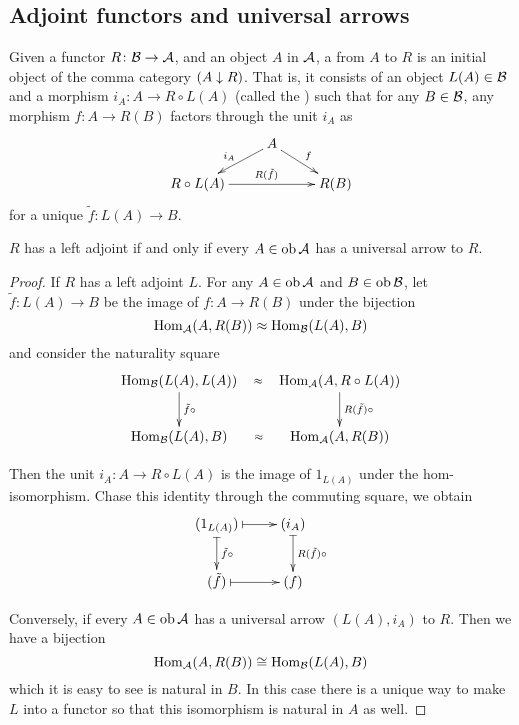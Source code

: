 \subsection{Adjoint functors and universal arrows}
  \begin{defn}
    Given a functor $R\colon{\cal B}\to{\cal A}$, and an object $A$ in ${\cal A}$, a  from $A$ to $R$ is an initial object of the comma category $(A\downarrow R)$. That is, it consists of an object $L(A)\in{\cal B}$ and a morphism $i_A : A\to R\circ L(A)$ (called the ) such that for any $B\in{\cal B}$, any morphism $f \colon A\to R(B)$ factors through the unit $i_A$ as
    \begin{displaymath}
      \xymatrix@R=0.5cm{
        &A\ar[dl]_{i_A}\ar[dr]^{f}&\\
        R\circ L(A)\ar[rr]^{R(\tilde{f})}&&R(B)
        }
    \end{displaymath}
    for a unique $\tilde{f}\colon L(A)\to B$.%
  \end{defn}
  \begin{prop}
    $R$ has a left adjoint if and only if every $A\in\operatorname{ob}{\cal A}$ has a universal arrow to $R$.
  \end{prop}
  \begin{proof}
    If $R$ has a left adjoint $L$. For any $A\in\operatorname{ob}{\cal A}$ and $B\in\operatorname{ob}{\cal B}$,
    let $\tilde{f} \colon L(A) \to B$ be the image of $f \colon A \to R(B)$ under the bijection
    \begin{equation*}
      \operatorname{Hom}_{{\cal A}}(A,R(B))\approx\operatorname{Hom}_{{\cal B}}(L(A),B)
    \end{equation*}
    and consider the naturality square
    \begin{displaymath}
      \xymatrix{
        \Hom_{\Bb}(L(A),L(A))\ar@{}[r]|-{\approx}\ar[d]^{\tilde{f}\circ}
        &\Hom_{\Aa}(A,R\circ L(A))\ar[d]^{R(\tilde{f})\circ}
        \\
        \Hom_{\Bb}(L(A),B)\ar@{}[r]|-{\approx}
        &\Hom_{\Aa}(A,R(B))
        }
    \end{displaymath}

    Then the unit $i_A\colon A\to R\circ L(A)$ is the image of $1_{L(A)}$ under the hom-isomorphism. Chase this identity through the commuting square, we obtain
    \begin{displaymath}
      \xymatrix{
        (1_{L(A)})\ar@{|->}[r]\ar@{|->}[d]^{\tilde{f}\circ}
        &(i_A)\ar@{|->}[d]^{R(\tilde{f})\circ}
        \\
        (\tilde{f})\ar@{|->}[r]
        &(f)
        }
    \end{displaymath}

    Conversely, if every $A\in\operatorname{ob}{\cal A}$ has a universal arrow $(L(A),i_A)$ to $R$. Then we have a bijection
    \begin{equation*}
      \operatorname{Hom}_{{\cal A}}(A,R(B))\cong\operatorname{Hom}_{{\cal B}}(L(A),B)
    \end{equation*}
    which it is easy to see is natural in $B$. In this case there is a unique way to make $L$ into a functor so that this isomorphism is natural in $A$ as well.
  \end{proof}

